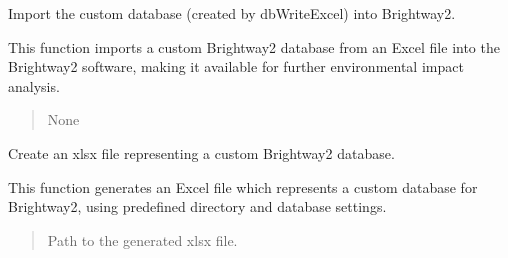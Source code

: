 \documentclass[letterpaper,10pt,english]{sphinxmanual}
\begin{document}
\begin{fulllineitems}
\label{\detokenize{WasteAndMaterialFootprint:WasteAndMaterialFootprint.MakeCustomDatabase.dbExcel2BW}}
\pysigstartsignatures
{}
\pysigstopsignatures
\sphinxAtStartPar
Import the custom database (created by dbWriteExcel) into Brightway2.

\sphinxAtStartPar
This function imports a custom Brightway2 database from an Excel file into the Brightway2 software,
making it available for further environmental impact analysis.
\begin{quote}\begin{description}
\sphinxAtStartPar
None

\end{description}\end{quote}

\end{fulllineitems}


\begin{fulllineitems}
\label{\detokenize{WasteAndMaterialFootprint:WasteAndMaterialFootprint.MakeCustomDatabase.dbWriteExcel}}
\pysigstartsignatures
{}
\pysigstopsignatures
\sphinxAtStartPar
Create an xlsx file representing a custom Brightway2 database.

\sphinxAtStartPar
This function generates an Excel file which represents a custom database for Brightway2,
using predefined directory and database settings.
\begin{quote}\begin{description}
\sphinxAtStartPar
Path to the generated xlsx file.

\end{description}\end{quote}

\end{fulllineitems}

\end{document}
